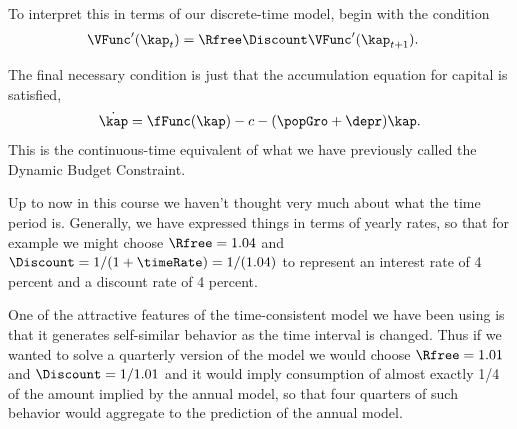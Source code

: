 \documentclass{handout}
\begin{document}
To interpret this in terms of our discrete-time model, begin with
the condition
\begin{equation}\begin{gathered}\begin{aligned}
        \VFunc^{\prime}(\kap_{t}) & =  \Rfree\Discount \VFunc^{\prime}(\kap_{t+1}).
\end{aligned}\end{gathered}\end{equation}

The final necessary condition is just that the accumulation equation for
capital is satisfied,
\begin{equation}
        \dot{\kap} = \fFunc(\kap)-c-(\popGro+\depr)\kap.
        \label{eq:accum}
\end{equation}
This is the continuous-time equivalent of what we have previously called
the Dynamic Budget Constraint.


Up to now in this course we haven't thought very much about what the
time period is.  Generally, we have expressed things in terms of
yearly rates, so that for example we might choose $\Rfree=1.04$ and
$\Discount=1/(1+\timeRate)=1/(1.04)$ to represent an interest rate of
4 percent and a discount rate of 4 percent.

One of the attractive features of the time-consistent model we have 
been using is that it generates self-similar behavior as the time interval is 
changed.  Thus if we wanted to solve a quarterly version of the model 
we would choose $\Rfree=1.01$ and $\Discount=1/1.01$ and it would imply 
consumption of almost exactly 1/4 of the amount implied by the annual 
model, so that four quarters of such behavior would aggregate to the 
prediction of the annual model.
\end{document}
